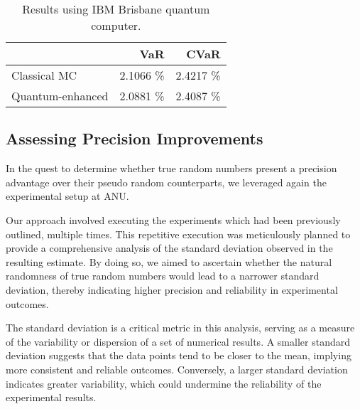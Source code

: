 \documentclass{article}
\begin{document}
\begin{table}[h]
  \centering
  \begin{tabular}{lrr}
    \toprule
     & VaR & CVaR \\ \midrule
    Classical MC & 2.1066 \% & 2.4217 \% \\ 
    Quantum-enhanced & 2.0881 \% & 2.4087 \% \\ \bottomrule
  \end{tabular}
  \caption{Results using IBM Brisbane quantum computer.}
  \label{tab:ibm_results}
\end{table}

\subsection{Assessing Precision Improvements}
In the quest to determine whether true random numbers present a precision advantage over their pseudo random counterparts, we leveraged again the experimental setup at ANU. 

Our approach involved executing the experiments which had been previously outlined, multiple times. 
This repetitive execution was meticulously planned to provide a comprehensive analysis of the standard deviation observed in the resulting estimate. 
By doing so, we aimed to ascertain whether the natural randomness of true random numbers would lead to a narrower standard deviation, thereby indicating higher precision and reliability in experimental outcomes.

The standard deviation is a critical metric in this analysis, serving as a measure of the variability or dispersion of a set of numerical results. 
A smaller standard deviation suggests that the data points tend to be closer to the mean, implying more consistent and reliable outcomes. Conversely, a larger standard deviation indicates greater variability, which could undermine the reliability of the experimental results.
\end{document}
